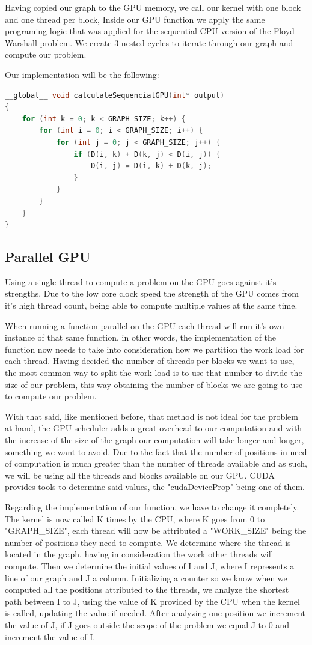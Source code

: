 \documentclass[conference]{IEEEtran}
\begin{document}
Having copied our graph to the GPU memory, we call our kernel with one block and one thread per block, 
Inside our GPU function we apply the same programing logic that was applied for the sequential CPU version of the Floyd-Warshall problem. 
We create 3 nested cycles to iterate through our graph and compute our problem.

Our implementation will be the following:
\begin{lstlisting}[language=C++, caption=Sequential CUDA]
	__global__ void calculateSequencialGPU(int* output)
{
	for (int k = 0; k < GRAPH_SIZE; k++) {
		for (int i = 0; i < GRAPH_SIZE; i++) {
			for (int j = 0; j < GRAPH_SIZE; j++) {
				if (D(i, k) + D(k, j) < D(i, j)) {
					D(i, j) = D(i, k) + D(k, j);
				}
			}
		}
	}
}
\end{lstlisting}


\subsection{Parallel GPU}
Using a single thread to compute a problem on the GPU goes against it's strengths. 
Due to the low core clock speed the strength of the GPU comes from it's high thread count, being able to compute multiple values at the same time. 

When running a function parallel on the GPU each thread will run it's own instance of that same function, in other words, the implementation of the function now needs to take into consideration how we partition the work load for each thread. 
Having decided the number of threads per blocks we want to use, the most common way to split the work load is to use that number to divide the size of our problem, this way obtaining the number of blocks we are going to use to compute our problem. 

With that said, like mentioned before, that method is not ideal for the problem at hand, the GPU scheduler adds a great overhead to our computation and with the increase of the size of the graph our computation will take longer and longer, something we want to avoid. Due to the fact that the number of positions in need of computation is much greater than the number of threads available and as such, we will be using all the threads and blocks available on our GPU. 
CUDA provides tools to determine said values, the "cudaDeviceProp" being one of them.

Regarding the implementation of our function, we have to change it completely.
The kernel is now called K times by the CPU, where K goes from 0 to "GRAPH\_SIZE", 
each thread will now be attributed a "WORK\_SIZE" being the number of positions they need to compute. 
We determine where the thread is located in the graph, having in consideration the work other threads will compute. Then we determine the initial values of I and J, where I represents a line of our graph and J a column. Initializing a counter so we know when we computed all the positions attributed to the threads, we analyze the shortest path between I to J, using the value of K provided by the CPU when the kernel is called, updating the value if needed. After analyzing one position we increment the value of J, if J goes outside the scope of the problem we equal J to 0 and increment the value of I.
\end{document}
